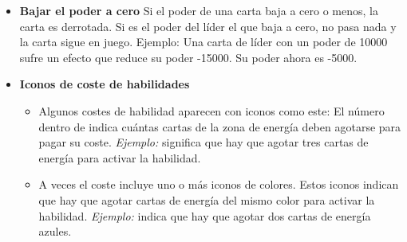 \documentclass[10pt,a4paper]{article}
\begin{document}
\begin{shaded}
\begin{itemize}
    \item \textbf{Bajar el poder a cero} \newline
    Si el poder de una carta baja a cero o menos, la carta es derrotada. Si es el poder del líder el que baja a cero, no pasa nada y la carta sigue en juego.
    Ejemplo: Una carta de líder con un poder de 10000 sufre un efecto que reduce su poder -15000. Su poder ahora es -5000.

    \item \textbf{Iconos de coste de habilidades}
    \begin{itemize}
      \item Algunos costes de habilidad aparecen con iconos como este:  \newline
      El número dentro de  indica cuántas cartas de la zona de energía deben agotarse para pagar su coste. \newline
      \emph{Ejemplo:}  significa que hay que agotar tres cartas de energía para activar la habilidad.
      \item A veces el coste incluye uno o más iconos  de colores. \newline
      Estos iconos indican que hay que agotar cartas de energía del mismo color para activar la habilidad. \newline
      \emph{Ejemplo:} {\color{blue}} indica que hay que agotar dos cartas de energía azules.
    \end{itemize}

  \end{itemize}

\end{shaded}
\end{document}
